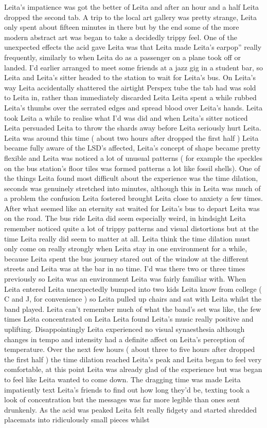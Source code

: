 \documentclass[12pt]{book}
\begin{document}
Leita's impatience was got the better of Leita and after an hour and a half Leita dropped the second tab. A trip to the local art gallery was pretty strange, Leita only spent about fifteen minutes in there but by the end some of the more modern abstract art was began to take a decidedly trippy feel. One of the unexpected effects the acid gave Leita was that Leita made Leita's earpop'' really frequently, similarly to when Leita do as a passenger on a plane took off or landed. I'd earlier arranged to meet some friends at a jazz gig in a student bar, so Leita and Leita's sitter headed to the station to wait for Leita's bus. On Leita's way Leita accidentally shattered the airtight Perspex tube the tab had was sold to Leita in, rather than immediately discarded Leita Leita spent a while rubbed Leita's thumbs over the serrated edges and spread blood over Leita's hands. Leita took Leita a while to realise what I'd was did and when Leita's sitter noticed Leita persuaded Leita to throw the shards away before Leita seriously hurt Leita. Leita was around this time ( about two hours after dropped the first half ) Leita became fully aware of the LSD's affected, Leita's concept of shape became pretty flexible and Leita was noticed a lot of unusual patterns ( for example the speckles on the bus station's floor tiles was formed patterns a lot like fossil shells). One of the things Leita found most difficult about the experience was the time dilation, seconds was genuinely stretched into minutes, although this in Leita was much of a problem the confusion Leita fostered brought Leita close to anxiety a few times. After what seemed like an eternity sat waited for Leita's bus to depart Leita was on the road. The bus ride Leita did seem especially weird, in hindsight Leita remember noticed quite a lot of trippy patterns and visual distortions but at the time Leita really did seem to matter at all. Leita think the time dilation must only come on really strongly when Leita stay in one environment for a while, because Leita spent the bus journey stared out of the window at the different streets and Leita was at the bar in no time. I'd was there two or three times previously so Leita was an environment Leita was fairly familiar with. When Leita entered Leita unexpectedly bumped into two kids Leita know from college ( C and J, for convenience ) so Leita pulled up chairs and sat with Leita whilst the band played. Leita can't remember much of what the band's set was like, the few times Leita concentrated on Leita Leita found Leita's music really positive and uplifting. Disappointingly Leita experienced no visual synaesthesia although changes in tempo and intensity had a definite affect on Leita's perception of temperature. Over the next few hours ( about three to five hours after dropped the first half ) the time dilation reached Leita's peak and Leita began to feel very comfortable, at this point Leita was already glad of the experience but was began to feel like Leita wanted to come down. The dragging time was made Leita impatiently text Leita's friends to find out how long they'd be, texting took a look of concentration but the messages was far more legible than ones sent drunkenly. As the acid was peaked Leita felt really fidgety and started shredded placemats into ridiculously small pieces whilst 
\end{document}
